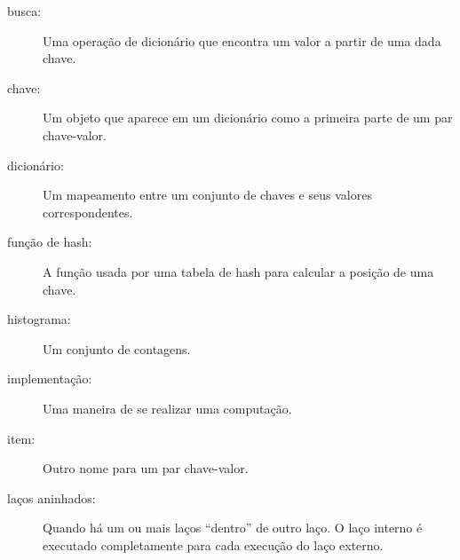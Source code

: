 \begin{description}

  \item[busca:] Uma operação de dicionário que encontra um valor a partir de uma dada chave.

  \item[chave:] Um objeto que aparece em um dicionário como a primeira parte de um par chave-valor.

\item[dicionário:] Um mapeamento entre um conjunto de chaves e seus valores correspondentes.

\item[função de hash:] A função usada por uma tabela de hash para calcular a posição de uma chave.

\item[histograma:] Um conjunto de contagens.

\item[implementação:] Uma maneira de se realizar uma computação.

\item[item:] Outro nome para um par chave-valor.

\item[laços aninhados:] Quando há um ou mais laços ``dentro'' de outro laço. O laço interno é executado completamente para cada execução do laço externo.


\end{description}

